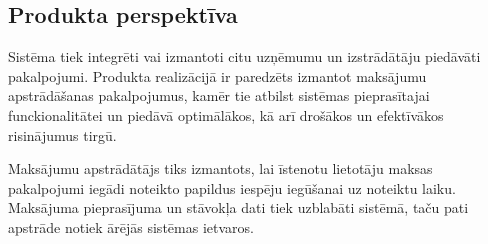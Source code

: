 \subsection{Produkta perspektīva}
Sistēma tiek integrēti vai izmantoti citu uzņēmumu un izstrādātāju piedāvāti pakalpojumi.
Produkta realizācijā ir paredzēts izmantot maksājumu apstrādāšanas pakalpojumus, kamēr tie atbilst sistēmas pieprasītajai funckionalitātei un piedāvā optimālākos, kā arī drošākos un efektīvākos risinājumus tirgū.

Maksājumu apstrādātājs tiks izmantots, lai īstenotu lietotāju maksas pakalpojumi iegādi noteikto papildus iespēju iegūšanai uz noteiktu laiku.
Maksājuma pieprasījuma un stāvokļa dati tiek uzblabāti sistēmā, taču pati apstrāde notiek ārējās sistēmas ietvaros.
